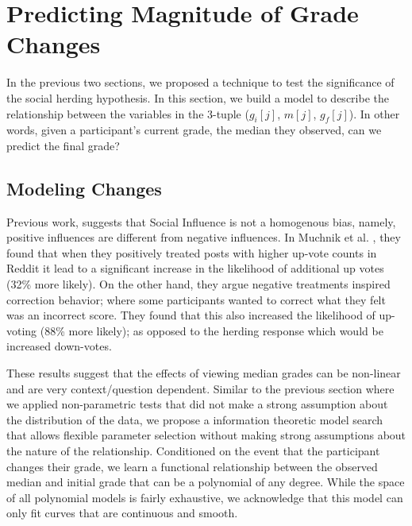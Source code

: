 \section{Predicting Magnitude of Grade Changes}
\label{changemod}
In the previous two sections, we proposed a technique to test the significance of the social herding hypothesis.
In this section, we build a model to describe the relationship between the variables in the 3-tuple ($g_i[j]$, $m[j]$, $g_f[j]$).
In other words, given a participant's current grade, the median they observed, can we predict the final grade?

\subsection{Modeling Changes}
Previous work, suggests that Social Influence is not a homogenous bias, namely, positive influences are different from negative influences.
In Muchnik et al. \cite{muchnik2013social}, they found that when they positively treated posts with higher up-vote counts in Reddit it lead to a significant increase in the likelihood of additional up votes (32\% more likely). 
On the other hand, they argue negative treatments inspired correction behavior; where some participants wanted to correct what they felt was an incorrect score. 
They found that this also increased the likelihood of up-voting (88\% more likely); as opposed to the herding response which would be increased down-votes.

These results suggest that the effects of viewing median grades can be non-linear and are very context/question dependent.
Similar to the previous section where we applied non-parametric tests that did not make a strong assumption about the distribution of the data, we propose a information theoretic model search that allows flexible parameter selection without making strong assumptions about the nature of the relationship.
Conditioned on the event that the participant changes their grade, we learn a functional relationship between the observed median and initial grade that can be a polynomial of any degree.
While the space of all polynomial models is fairly exhaustive, we acknowledge that this model can only fit curves that are continuous and smooth.

